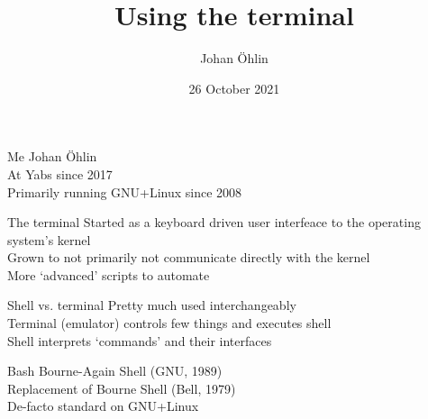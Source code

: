 \documentclass{beamer}
\title{Using the terminal}
\date{26 October 2021}
\author{Johan Öhlin}
\institute{Yabs}
\begin{document}
  \maketitle

  \begin{frame}{Me}
          Johan Öhlin           \\
          At Yabs since 2017    \\
          Primarily running GNU+Linux since 2008    \\
  \end{frame}
  \begin{frame}{The terminal}
          Started as a keyboard driven user interfeace to the operating system's
          kernel                                                            \\
          Grown to not primarily not communicate directly with the kernel   \\
          More `advanced' scripts to automate                               \\
  \end{frame}

  \begin{frame}{Shell vs. terminal}
          Pretty much used interchangeably                                  \\
          Terminal (emulator) controls few things and executes shell        \\
          Shell interprets `commands' and their interfaces                  \\
  \end{frame}
  
  \begin{frame}{Bash}
          Bourne-Again Shell (GNU, 1989)                                    \\
          Replacement of Bourne Shell (Bell, 1979)                          \\
          De-facto standard on GNU+Linux                                    \\
  \end{frame}
\end{document}
